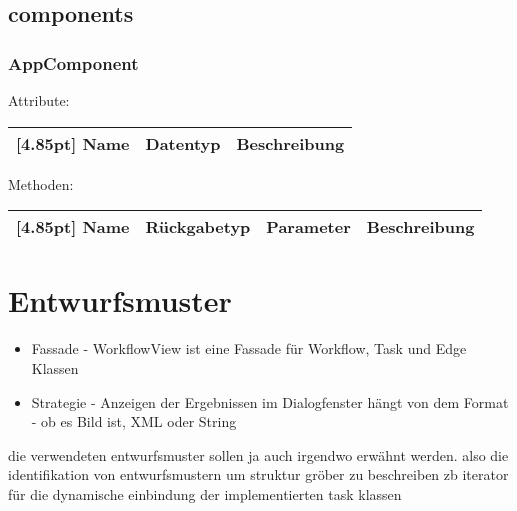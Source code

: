         \subsection{components}
        
            \subsubsection{AppComponent}
            
                Attribute:
                \begin{center}
                	\renewcommand{\arraystretch}{1.5}
                    \setlength\tabcolsep{5pt}
                	\begin{tabularx}{\textwidth}{|l|l|X|}
                		\hline
                        \rowcolor[gray]{0.75}[4.85pt]            		
                        Name & Datentyp & Beschreibung \\ \hline
                        
                	\end{tabularx}
                \end{center}
                
                Methoden:
        		\begin{center}
                \setlength\tabcolsep{5pt}
                	\renewcommand{\arraystretch}{1.5}
                    	\begin{tabularx}{\textwidth}{|l|l|l|X|}
                    	\hline
                    	\rowcolor[gray]{0.75}[4.85pt]
                		Name & Rückgabetyp & Parameter & Beschreibung \\ \hline 
                        
                        \end{tabularx}
        		\end{center}
	
	\section{Entwurfsmuster}
	
	\begin{itemize}
	    \item Fassade - WorkflowView ist eine Fassade für Workflow, Task und Edge Klassen
	    \item Strategie - Anzeigen der Ergebnissen im Dialogfenster hängt von dem Format - ob es Bild ist, XML oder String 
	\end{itemize}
	die verwendeten entwurfsmuster sollen ja auch irgendwo erwähnt werden.
	also die identifikation von entwurfsmustern um struktur gröber zu beschreiben
	zb iterator für die dynamische einbindung der implementierten task klassen
